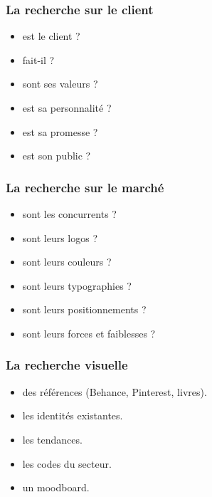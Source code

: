 \subsubsection{La recherche sur le client}

\begin{itemize}
    \item {} est le client ?
    \item {} fait-il ?
    \item {} sont ses valeurs ?
    \item {} est sa personnalité ?
    \item {} est sa promesse ?
    \item {} est son public ?
\end{itemize}

\subsubsection{La recherche sur le marché}

\begin{itemize}
    \item {} sont les concurrents ?
    \item {} sont leurs logos ?
    \item {} sont leurs couleurs ?
    \item {} sont leurs typographies ?
    \item {} sont leurs positionnements ?
    \item {} sont leurs forces et faiblesses ?
\end{itemize}

\subsubsection{La recherche visuelle}

\begin{itemize}
    \item {} des références (Behance, Pinterest, livres).
    \item {} les identités existantes.
    \item {} les tendances.
    \item {} les codes du secteur.
    \item {} un moodboard.
\end{itemize}

